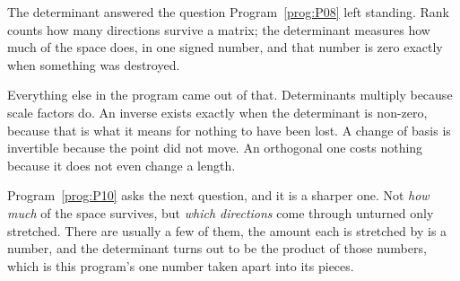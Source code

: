 \begin{fr}
The determinant answered the question Program~\ref{prog:P08} left standing.
Rank counts how many directions survive a matrix; the determinant measures how
much of the space does, in one signed number, and that number is zero exactly
when something was destroyed.

Everything else in the program came out of that. Determinants multiply because
scale factors do. An inverse exists exactly when the determinant is non-zero,
because that is what it means for nothing to have been lost. A change of basis
is invertible because the point did not move. An orthogonal one costs nothing
because it does not even change a length.

Program~\ref{prog:P10} asks the next question, and it is a sharper one. Not
\emph{how much} of the space survives, but \emph{which directions} come through
unturned \dash{} only stretched. There are usually a few of them, the amount
each is stretched by is a number, and the determinant turns out to be the
product of those numbers, which is this program's one number taken apart into
its pieces.
\end{fr}

